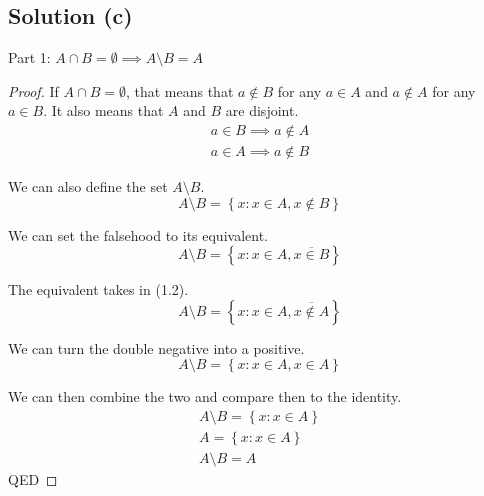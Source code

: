 \documentclass[12pt]{report}
\begin{document}
\subsection{Solution (c)}
Part 1: $A \cap B = \emptyset \implies A \setminus B = A$
\begin{proof}
    If $A \cap B = \emptyset$, that means that $a \notin B$ for any $a \in A$ and $a \notin A$ for any $a \in B$.
    It also means that $A$ and $B$ are disjoint.
    \begin{gather}
        a \in B \implies a \notin A\\
        a \in A \implies a \notin B
    \end{gather}
    
    We can also define the set $A \setminus B$.
    \begin{equation}
        A \setminus B = \left\{ x: x \in A, x \notin B \right\}
    \end{equation}
    
    We can set the falsehood to its equivalent.
    \begin{equation}
        A \setminus B = \left\{ x: x \in A, \overline{x \in B} \right\}
    \end{equation}

    The equivalent takes in (1.2).
    \begin{equation}
        A \setminus B = \left\{ x: x \in A, \overline{x \notin A} \right\}
    \end{equation}

    We can turn the double negative into a positive.
    \begin{equation}
        A \setminus B = \left\{ x: x \in A, x \in A \right\}
    \end{equation}

    We can then combine the two and compare then to the identity.
    \begin{gather}
        A \setminus B = \left\{ x: x \in A \right\}\\
        A = \left\{x : x \in A\right\}\\
        A \setminus B = A
    \end{gather}
    QED
\end{proof}
\end{document}
